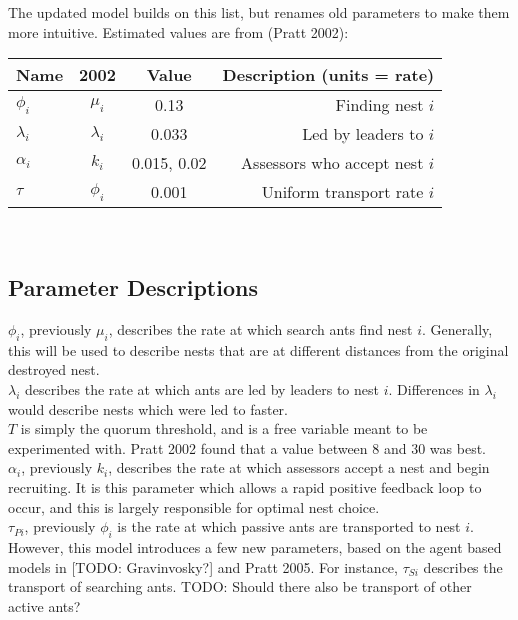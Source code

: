 \documentclass{article}
\begin{document}
The updated model builds on this list, but renames old parameters to make them more intuitive. Estimated values are from (Pratt 2002): \\

\begin{tabular}{ l | c | c | r }
    \hline
  Name          & 2002        & Value & Description (units = rate)\\ \hline
  {$\phi_i$}      & $\mu_i$     & 0.13 & Finding nest $i$\\
  {$\lambda_i$}   & $\lambda_i$ & 0.033 & Led by leaders to $i$\\
  {$\alpha_i$}    & $k_i$       & 0.015, 0.02 & Assessors who accept nest $i$\\ \hline
  {$\tau$}        & $\phi_i$    & 0.001  & Uniform transport rate $i$\\
  \hline
\end{tabular} \\

\subsection{Parameter Descriptions} 

$\phi_i$, previously $\mu_i$, describes the rate at which search ants find nest $i$. 
Generally, this will be used to describe nests that are at different distances from the original destroyed nest. \\
$\lambda_i$ describes the rate at which ants are led by leaders to nest $i$. 
Differences in $\lambda_i$ would describe nests which were led to faster. \\
$T$ is simply the quorum threshold, and is a free variable meant to be experimented with.
Pratt 2002 found that a value between $8$ and $30$ was best. \\
$\alpha_i$, previously $k_i$, describes the rate at which assessors accept a nest and begin recruiting.
It is this parameter which allows a rapid positive feedback loop to occur, and this is largely responsible for optimal nest choice. \\
$\tau_{Pi}$, previously $\phi_i$ is the rate at which passive ants are transported to nest $i$.
However, this model introduces a few new parameters, based on the agent based models in [TODO: Gravinvosky?] and Pratt 2005. 
For instance, $\tau_{Si}$ describes the transport of searching ants. 
TODO: Should there also be transport of other active ants? \\
\end{document}
